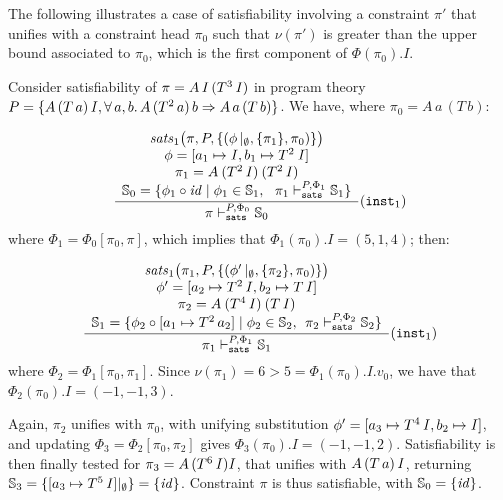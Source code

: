 The following illustrates a case of satisfiability involving a
constraint $\pi'$ that unifies with a constraint head $\pi_0$ such
that $\nu(\pi')$ is greater than the upper bound associated to
$\pi_0$, which is the first component of $\Phi(\pi_0).I$.

\begin{Example}
\label{sat-eta-greater} {\rm

Consider satisfiability of $\pi=A\,\text{\it I\/}\,(T^3\,\text{\it I\/})$ in program theory $P
= \{ A\,(T\,a)\,\text{\it I\/}, \forall\, a,b.\,A\,(T^2\, a)\,b \Rightarrow
A\,a\,(T\,b)\}$. We have, where $\pi_0 = A\,a\,(T\,b)$:

\[
	\displaystyle\frac
		{\begin{array}{c}
            \textit{sats\/}_1\bigl(\pi,P,\{ ( \phi\,|_\emptyset, \{ \pi_1 \}, \pi_0 ) \}\bigr) \\
            \phi = [a_1\mapsto \text{\it I\/}, b_1\mapsto T^2\:\text{\it I\/}] \\
            \pi_1 = A\:(T^2\,\text{\it I\/})\:(T^2\,\text{\it I\/})\\
            \mathbb{S}_0 = \{ \phi_1\circ {\it id\/} \mid \phi_1 \in \mathbb{S}_1,\:\:\:
            \pi_1 \vdash_{\texttt{sats}}^{P,\Phi_1} \mathbb{S}_1\}
         \end{array}}
		{\pi \vdash_{\texttt{sats}}^{P,\Phi_0} \mathbb{S}_0} ({\text{\tt inst}}_1)
\]
where $\Phi_1 = \Phi_0 [\pi_0, \pi]$, which implies that $\Phi_1(\pi_0).I = (5,1,4)$; then:

\[
	\displaystyle\frac
		{\begin{array}{c}
            \textit{sats\/}_1\bigl(\pi_1,P, \{ ( \phi'\,|_\emptyset, \{\pi_2\}, \pi_0 ) \}\bigr)\\
            \phi' = [a_2\mapsto T^2\,\text{\it I\/}, b_2\mapsto T\,\text{\it I\/}] \\
	    \pi_2 = A\:(T^4\,\text{\it I\/})\:(T\,\text{\it I\/})\\
            \mathbb{S}_1 = \{ \phi_2\circ [a_1\mapsto T^2\,a_2] \mid \phi_2 \in \mathbb{S}_2,\:\:
            \pi_2 \vdash_{\texttt{sats}}^{P,\Phi_2} \mathbb{S}_2\}
         \end{array}}
		{\pi_1 \vdash_{\texttt{sats}}^{P,\Phi_1} \mathbb{S}_1} ({\text{\tt inst}}_1)
\]
where  $\Phi_2 = \Phi_1 [\pi_0, \pi_1]$.
Since $\nu(\pi_1) = 6 > 5 = \Phi_1(\pi_0).I.v_0$,
we have that $\Phi_2(\pi_0).I = (-1,-1,3)$.

Again, $\pi_2$ unifies with $\pi_0$, with unifying substitution
$\phi' =  [a_3\mapsto T^4\,\text{\it I\/}, b_2\mapsto \text{\it I\/}] $, and
updating $\Phi_3 = \Phi_2[\pi_0,\pi_2]$ gives $\Phi_3(\pi_0).I = (-1,-1,2)$.
Satisfiability is then finally tested for $\pi_3 = A\,(T^6\,\text{\it I\/}) \text{\it I\/}$, that unifies with
$A\,(T\,a)\,\text{\it I\/}$, returning $\mathbb{S}_3 = \{ [a_3\mapsto
  T^5\,\text{\it I\/}]|_\emptyset\} = \{ {\it id\/}\}$.  Constraint $\pi$ is thus
satisfiable, with $\mathbb{S}_0 = \{{\it id\/}\}$.}
\end{Example}

